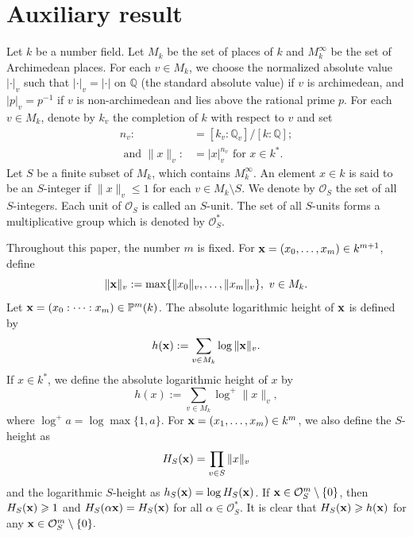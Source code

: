 \documentclass[12pt,leqno]{amsart}
\renewcommand{\P}{{\mathbb{P}}}
\numberwithin{equation}{section}
\begin{document}
\section{Auxiliary result}

Let $k$ be a number field. Let $M_k$ be the set of places of $k$ and $M^{\infty}_k$ be the set of Archimedean places. For each $v\in M_k$, we choose the normalized absolute value $|\cdot |_v$ such that $|\cdot |_v=|\cdot|$ on $\mathbb Q$ (the standard absolute value) if $v$ is archimedean, and $|p|_v=p^{-1}$ if $v$ is non-archimedean and lies above the rational prime $p$. For each $v\in M_k$, denote by $k_v$ the completion of $k$ with respect to $v$ and set 
\begin{align*}
n_v :&= [k_v :\mathbb Q_v]/[k :\mathbb Q];\\ 
\text{ and }\|x\|_v:& =|x|^{n_v}_v\text{ for }  x\in k^*.
\end{align*}
Let $S$ be a finite subset of $M_k$, which contains $M^{\infty}_k$. An element $x\in k$ is said to be an $S$-integer if $\|x\|_v\leqslant 1$ for each $v\in M_k\setminus S$. We denote by $\mathcal O_S$ the set of all $S$-integers. Each unit of $\mathcal O_{S}$ is called an $S$-unit. The set of all $S$-units forms a multiplicative group which is denoted by $\mathcal O_{S}^*$.

Throughout this paper, the number $m$ is fixed. For ${\bf x} = (x_0 ,\ldots , x_m)\in k^{m+1}$, define
$$\|{\bf x}\|_v :=\max\{\|x_0\|_v,\ldots,\|x_m\|_v\},\ v\in M_k.$$
Let ${\bf x}=(x_0:\cdots :x_m)\in\P^m(k)$. The absolute logarithmic height of ${\bf x}$  is defined by
$$h({\bf x}):=\sum_{v\in M_k}\log \|{\bf x}\|_v.$$
If $x\in k^*$, we define the absolute logarithmic height of $x$ by
$$h(x):=\sum_{v\in M_k}\log^+ \|x\|_v,$$
where $\log^+a=\log\max\{1,a\}.$
For ${\bf x}=(x_{1}, \ldots, x_{m}) \in k^{m}$, we also define the $S$-height as 
$$H_{S}({\bf x})=\prod_{v \in S}\|x\|_{v}$$ 
and the logarithmic $S$-height as $h_{S}({\bf x})=\log H_{S}({\bf x})$. 
If ${\bf x}\in\mathcal{O}_{S}^{m} \setminus\{0\}$, then $H_{S}({\bf x}) \geqslant 1$ and $H_{S}(\alpha {\bf x})=H_{S}({\bf x})$ for all $\alpha \in \mathcal{O}_{S}^{*}$. It is clear that $H_{S}({\bf x}) \geqslant h({\bf x})$ for any ${\bf x}\in \mathcal{O}_{S}^{m} \setminus\{0\}.$
\end{document}
